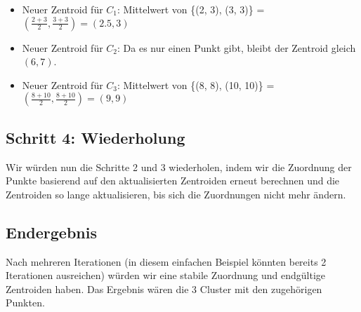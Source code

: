 \documentclass{article}
\begin{document}
\begin{itemize}
    \item Neuer Zentroid für \( C_1 \): Mittelwert von \{(2, 3), (3, 3)\} = \(\left(\frac{2+3}{2}, \frac{3+3}{2}\right) = (2.5, 3)\)
    \item Neuer Zentroid für \( C_2 \): Da es nur einen Punkt gibt, bleibt der Zentroid gleich \( (6, 7) \).
    \item Neuer Zentroid für \( C_3 \): Mittelwert von \{(8, 8), (10, 10)\} = \(\left(\frac{8+10}{2}, \frac{8+10}{2}\right) = (9, 9)\)
\end{itemize}

\subsection*{Schritt 4: Wiederholung}
Wir würden nun die Schritte 2 und 3 wiederholen, indem wir die Zuordnung der Punkte basierend auf den aktualisierten Zentroiden erneut berechnen und die Zentroiden so lange aktualisieren, bis sich die Zuordnungen nicht mehr ändern.

\subsection*{Endergebnis}
Nach mehreren Iterationen (in diesem einfachen Beispiel könnten bereits 2 Iterationen ausreichen) würden wir eine stabile Zuordnung und endgültige Zentroiden haben. Das Ergebnis wären die 3 Cluster mit den zugehörigen Punkten.
\end{document}
